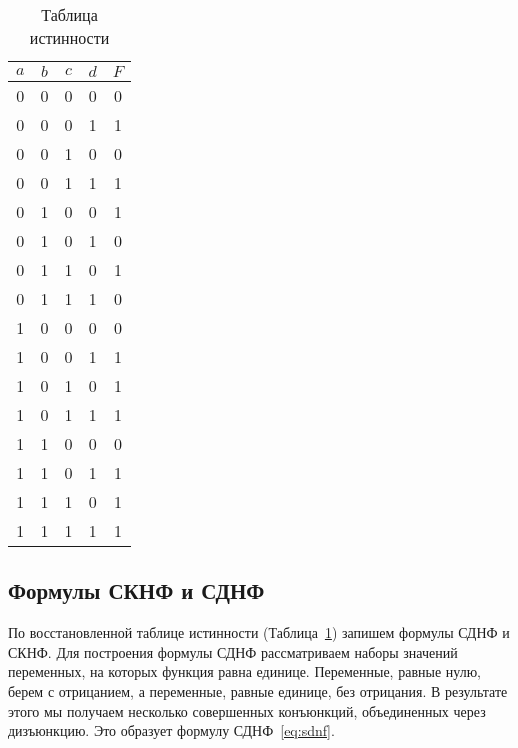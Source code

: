 \documentclass[a4paper]{article}
\begin{document}
    \begin{table}[h]
        \begin{center}
            \begin{tabular}{ | c | c | c | c | c | }
                \hline
                $ a $ & $ b $ & $ c $ & $ d $ & $ F $ \\
                \hline
                0     & 0     & 0     & 0     & 0     \\
                \hline
                0     & 0     & 0     & 1     & 1     \\
                \hline
                0     & 0     & 1     & 0     & 0     \\
                \hline
                0     & 0     & 1     & 1     & 1     \\
                \hline
                0     & 1     & 0     & 0     & 1     \\
                \hline
                0     & 1     & 0     & 1     & 0     \\
                \hline
                0     & 1     & 1     & 0     & 1     \\
                \hline
                0     & 1     & 1     & 1     & 0     \\
                \hline
                1     & 0     & 0     & 0     & 0     \\
                \hline
                1     & 0     & 0     & 1     & 1     \\
                \hline
                1     & 0     & 1     & 0     & 1     \\
                \hline
                1     & 0     & 1     & 1     & 1     \\
                \hline
                1     & 1     & 0     & 0     & 0     \\
                \hline
                1     & 1     & 0     & 1     & 1     \\
                \hline
                1     & 1     & 1     & 0     & 1     \\
                \hline
                1     & 1     & 1     & 1     & 1     \\
                \hline
            \end{tabular}
        \end{center}
        \caption{Таблица истинности}
        \label{tab:truth}
    \end{table}

    \subsection{Формулы СКНФ и СДНФ}\label{subsec:formulas}
    По восстановленной таблице истинности (Таблица~\ref{tab:truth}) запишем формулы СДНФ и СКНФ.
    Для построения формулы СДНФ рассматриваем наборы значений переменных, на которых функция равна единице.
    Переменные, равные нулю, берем с отрицанием, а переменные, равные единице, без отрицания.
    В результате этого мы получаем несколько совершенных конъюнкций, объединенных через дизъюнкцию.
    Это образует формулу СДНФ~\eqref{eq:sdnf}.
\end{document}
